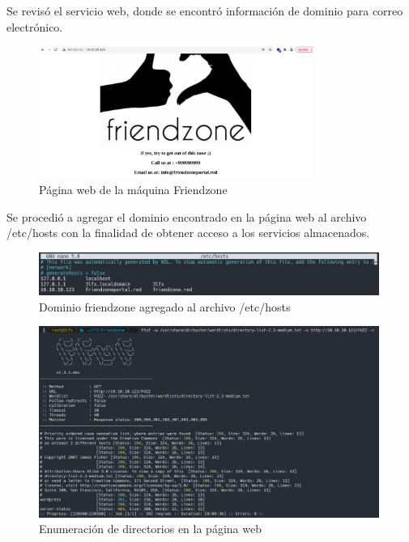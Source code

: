         \large{Se revisó el servicio web, donde se encontró información de dominio para correo electrónico.}
        \begin{figure}[H]
            \centering
            \includegraphics[width=0.8\textwidth]{informe4/imagenes/friendzone/06_web.png}
            \caption{Página web de la máquina Friendzone} 
        \end{figure}

        \large{Se procedió a agregar el dominio encontrado en la página web al archivo /etc/hosts con la finalidad de obtener acceso a los servicios almacenados.}
        \begin{figure}[H]
            \centering
            \includegraphics[width=0.99\textwidth]{informe4/imagenes/friendzone/07_etchosts.png}
            \caption{Dominio friendzone agregado al archivo /etc/hosts} 
        \end{figure}

        \begin{figure}[H]
            \centering
            \includegraphics[width=0.99\textwidth]{informe4/imagenes/friendzone/08_ffuf.png}
            \caption{Enumeración de directorios en la página web} 
        \end{figure}

